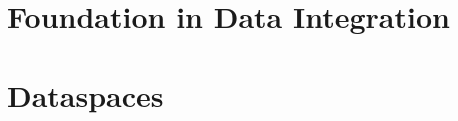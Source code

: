 \documentclass[a4paper,12pt,titlepage, openany, openright, cleardoubleempty]{scrreprt} %
\begin{document}
\graphicspath{{pics/}}

\pagestyle{empty}




\pagestyle{fancy}



\tableofcontents

\cleardoublepage %

\listoftables
{}

\listoffigures
{}

\cleardoublepage
{}

%


\chapter{Foundation in Data Integration}

\chapter{Dataspaces} \label{chapter_dataspaces}

%
%
%
%
%

\end{document}
